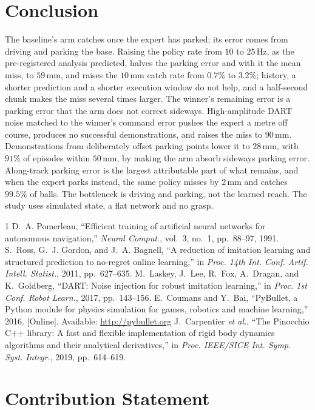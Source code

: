 \documentclass[conference]{IEEEtran}
\begin{document}
\section{Conclusion}
The baseline's arm catches once the expert has parked; its error comes from driving and parking the base. Raising the policy rate from $10$ to $25\,\mathrm{Hz}$, as the pre-registered analysis predicted, halves the parking error and with it the mean miss, to $59\,\mathrm{mm}$, and raises the $10\,\mathrm{mm}$ catch rate from $0.7\%$ to $3.2\%$; history, a shorter prediction and a shorter execution window do not help, and a half-second chunk makes the miss several times larger. The winner's remaining error is a parking error that the arm does not correct sideways. High-amplitude DART noise matched to the winner's command error pushes the expert a metre off course, produces no successful demonstrations, and raises the miss to $90\,\mathrm{mm}$. Demonstrations from deliberately offset parking points lower it to $28\,\mathrm{mm}$, with $91\%$ of episodes within $50\,\mathrm{mm}$, by making the arm absorb sideways parking error. Along-track parking error is the largest attributable part of what remains, and when the expert parks instead, the same policy misses by $2\,\mathrm{mm}$ and catches $99.5\%$ of balls. The bottleneck is driving and parking, not the learned reach. The study uses simulated state, a flat network and no grasp.

\begin{thebibliography}{1}
D.~A. Pomerleau, ``Efficient training of artificial neural networks for autonomous navigation,'' \emph{Neural Comput.}, vol.~3, no.~1, pp.~88--97, 1991.
S.~Ross, G.~J. Gordon, and J.~A. Bagnell, ``A reduction of imitation learning and structured prediction to no-regret online learning,'' in \emph{Proc. 14th Int. Conf. Artif. Intell. Statist.}, 2011, pp.~627--635.
M.~Laskey, J.~Lee, R.~Fox, A.~Dragan, and K.~Goldberg, ``{DART}: Noise injection for robust imitation learning,'' in \emph{Proc. 1st Conf. Robot Learn.}, 2017, pp.~143--156.
E.~Coumans and Y.~Bai, ``PyBullet, a Python module for physics simulation for games, robotics and machine learning,'' 2016. [Online]. Available: \url{http://pybullet.org}
J.~Carpentier \emph{et al.}, ``The {P}inocchio {C}++ library: A fast and flexible implementation of rigid body dynamics algorithms and their analytical derivatives,'' in \emph{Proc. IEEE/SICE Int. Symp. Syst. Integr.}, 2019, pp.~614--619.
\end{thebibliography}

\clearpage
\section*{Contribution Statement}
\end{document}
